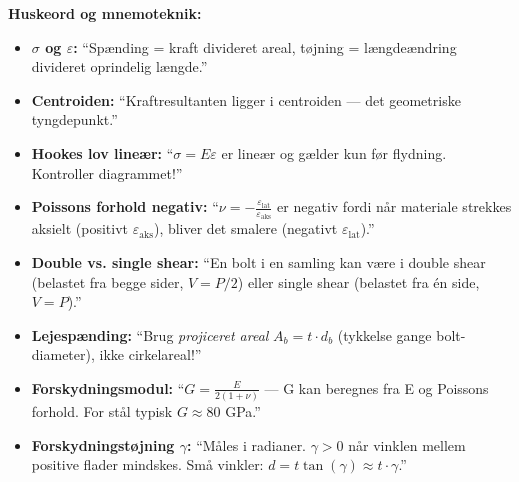 \clearpage

\begin{opfbox}

\textbf{Huskeord og mnemoteknik:}

\begin{itemize}
  \item \textbf{$\sigma$ og $\varepsilon$:} ``Spænding = kraft divideret areal, tøjning = længdeændring divideret oprindelig længde.''

  \item \textbf{Centroiden:} ``Kraftresultanten ligger i centroiden --- det geometriske tyngdepunkt.''

  \item \textbf{Hookes lov lineær:} ``$\sigma = E\varepsilon$ er lineær og gælder kun før flydning. Kontroller diagrammet!''

  \item \textbf{Poissons forhold negativ:} ``$\nu = -\frac{\varepsilon_{\text{lat}}}{\varepsilon_{\text{aks}}}$ er negativ fordi når materiale strekkes aksielt (positivt $\varepsilon_{\text{aks}}$), bliver det smalere (negativt $\varepsilon_{\text{lat}}$).''

  \item \textbf{Double vs. single shear:} ``En bolt i en samling kan være i double shear (belastet fra begge sider, $V = P/2$) eller single shear (belastet fra én side, $V = P$).''

  \item \textbf{Lejespænding:} ``Brug \emph{projiceret areal} $A_b = t \cdot d_b$ (tykkelse gange bolt-diameter), ikke cirkelareal!''

  \item \textbf{Forskydningsmodul:} ``$G = \frac{E}{2(1+\nu)}$ --- G kan beregnes fra E og Poissons forhold. For stål typisk $G \approx 80$ GPa.''

  \item \textbf{Forskydningstøjning $\gamma$:} ``Måles i radianer. $\gamma > 0$ når vinklen mellem positive flader mindskes. Små vinkler: $d = t \tan(\gamma) \approx t \cdot \gamma$.''

\end{itemize}

\end{opfbox}


